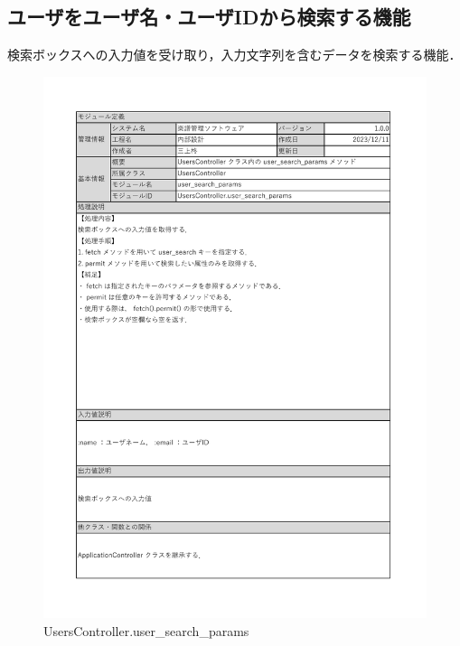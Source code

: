 \subsection*{ユーザをユーザ名・ユーザIDから検索する機能}
検索ボックスへの入力値を受け取り，入力文字列を含むデータを検索する機能．
\begin{figure}[H]
    \centering
    \includegraphics[scale=0.5]{img/Method/user_search_params.pdf}
    \caption{UsersController.user\_search\_params}
\end{figure}

